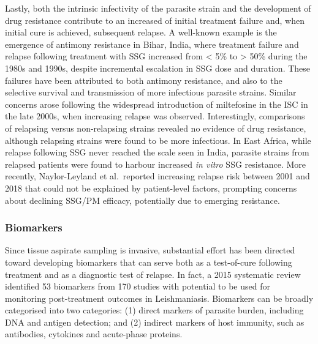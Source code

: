 
Lastly, both the intrinsic infectivity of the parasite strain and the development of drug resistance contribute to an increased  of initial treatment failure and, when initial cure is achieved, subsequent relapse. A well-known example is the emergence of antimony resistance in Bihar, India, where treatment failure and relapse  following treatment with SSG increased from < 5\% to > 50\% during the 1980s and 1990s, despite incremental escalation in SSG dose and duration\cite{olliaro2005, sundar2001}. These failures have been attributed to both antimony resistance\cite{jeddi2011}, and also to the selective survival and transmission of more infectious parasite strains\cite{vanaerschot2011}. Similar concerns arose following the widespread introduction of miltefosine in the ISC in the late 2000s, when increasing relapse  was observed\cite{rijal2013, sundar2012, singh2016}. Interestingly, comparisons of relapsing versus non-relapsing strains revealed no evidence of drug resistance, although relapsing strains were found to be more infectious\cite{rai2013}. In East Africa, while relapse  following SSG never reached the scale seen in India, parasite strains from relapsed patients were found to harbour increased \textit{in vitro} SSG resistance\cite{mukhtar2003}. More recently, Naylor-Leyland et al.\ reported increasing relapse risk between 2001 and 2018 that could not be explained by patient-level factors, prompting concerns about declining SSG/PM efficacy, potentially due to emerging resistance\cite{naylor-leyland2022}.


\subsubsection{Biomarkers\label{sec:biomarkers}}

Since tissue aspirate sampling is invasive, substantial effort has been directed toward developing biomarkers that can serve both as a test-of-cure following treatment and as a diagnostic test of relapse\cite{WHO2024_Leishmaniasis}. In fact, a 2015 systematic review identified 53 biomarkers from 170 studies with potential to be used for monitoring post-treatment outcomes in Leishmaniasis\cite{kip2015}. Biomarkers can be broadly categorised into two categories: (1) direct markers of parasite burden, including DNA and antigen detection; and (2) indirect markers of host immunity, such as antibodies, cytokines and acute-phase proteins.

